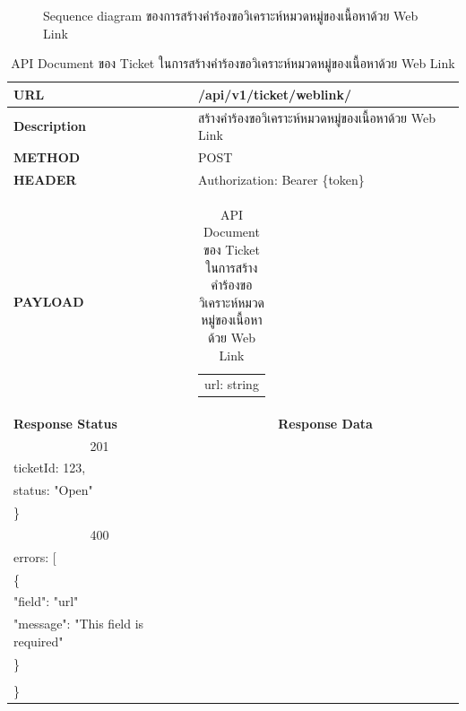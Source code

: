 \documentclass[12pt,oneside,openright,a4paper]{cpe-thai-project}
\begin{document}
\begin{itemize}
\begin{figure}[!ht]
  \caption{Sequence diagram ของการสร้างคำร้องขอวิเคราะห์หมวดหมู่ของเนื้อหาด้วย Web Link}\label{fig:seq_weblink} 
\end{figure} 
\begin{longtable}[!ht]{p{3cm}|p{8cm}}
  \caption{API Document ของ Ticket ในการสร้างคำร้องขอวิเคราะห์หมวดหมู่ของเนื้อหาด้วย Web Link}\label{tbl:api_ticket_weblink} 
    \endfirsthead
    \endhead
    \hhline{==}
    \textbf{URL}              & /api/v1/ticket/weblink/                                                                                              \\ \hline
    \textbf{Description}      & สร้างคำร้องขอวิเคราะห์หมวดหมู่ของเนื้อหาด้วย Web Link                                                                                        \\ \hline
    \textbf{METHOD}           & POST                                                                                                                 \\ \hline
    \textbf{HEADER}           & Authorization: Bearer \{token\}                                                                                         \\ \hline
    \textbf{PAYLOAD}          & \begin{tabular}[c]{@{}l@{}}url: string\end{tabular}  \\ \hline \newpage \hline
    \textbf{Response Status}  & \multicolumn{1}{c}{\textbf{Response Data}}                                                                          \\ \hline
    \multicolumn{1}{c|}{201}  & \begin{tabular}[c]{@{}l@{}}\{\\ \quad ticketId: 123,\\ \quad status: "Open"\\ \}\end{tabular}                                 \\ \hline
    \multicolumn{1}{c|}{400}  &
    \begin{tabular}[c]{@{}l@{}}\{\\ \quad errors: {[}\\ \quad\quad\{\\ \quad\quad\quad "field": "url"\\ \quad\quad\quad "message": "This field is required"\\ \quad\quad \}\\ \quad{]}\\\}\end{tabular} \\ \hline

\end{longtable}
\end{itemize}
\end{document}
